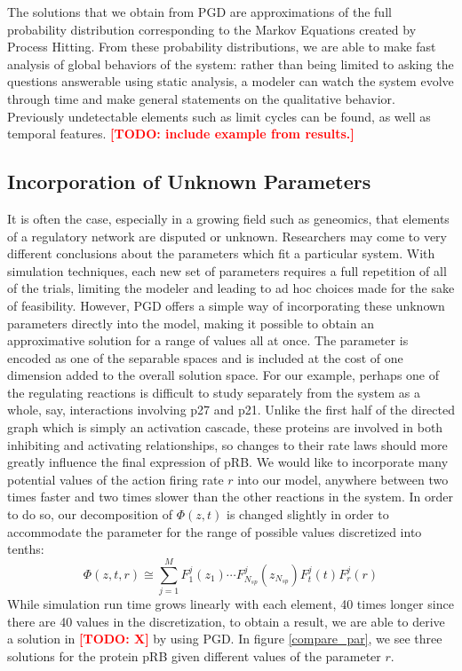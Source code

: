 \documentclass{article}
\newcommand{\lighttodo}[1]{\textcolor{red}{#1}}
\newcommand{\todo}[1]{\lighttodo{\textbf{[TODO: #1]}}}
\begin{document}
The solutions that we obtain from PGD are approximations of the full probability distribution corresponding to the Markov Equations created by Process Hitting. From these probability distributions, we are able to make fast analysis of global behaviors of the system: rather than being limited to asking the questions answerable using static analysis, a modeler can watch the system evolve through time and make general statements on the qualitative behavior. Previously undetectable elements such as limit cycles can be found, as well as temporal features. \todo{include example from results.}

\subsection{Incorporation of Unknown Parameters}\label{parameter}
It is often the case, especially in a growing field such as geneomics, that elements of a regulatory network are disputed or unknown. Researchers may come to very different conclusions about the parameters which fit a particular system. With simulation techniques, each new set of parameters requires a full repetition of all of the trials, limiting the modeler and leading to ad hoc choices made for the sake of feasibility. However, PGD offers a simple way of incorporating these unknown parameters directly into the model, making it possible to obtain an approximative solution for a range of values all at once\cite{chinesta2010use}. The parameter is encoded as one of the separable spaces and is included at the cost of one dimension added to the overall solution space. For our example, perhaps one of the regulating reactions is difficult to study separately from the system as a whole, say, interactions involving p27 and p21. Unlike the first half of the directed graph which is simply an activation cascade, these proteins are involved in both inhibiting and activating relationships, so changes to their rate laws should more greatly influence the final expression of pRB. We would like to incorporate many potential values of the action firing rate $r$ into our model, anywhere between two times faster and two times slower than the other reactions in the system. In order to do so, our decomposition of $\Phi(z,t)$ is changed slightly in order to accommodate the parameter for the range of possible values discretized into tenths:
\[
 \Phi(z,t,r)\cong \sum_{j=1}^{M}F_1^j(z_1)\cdots F_{N_{sp}}^j(z_{N_{sp}})F_t^j(t)F_r^j(r)
\]
While simulation run time grows linearly with each element, 40 times longer since there are 40 values in the discretization, to obtain a result, we are able to derive a solution in \todo{X} by using PGD. In figure \ref{compare_par}, we see three solutions for the protein pRB given different values of the parameter $r$.
\end{document}
